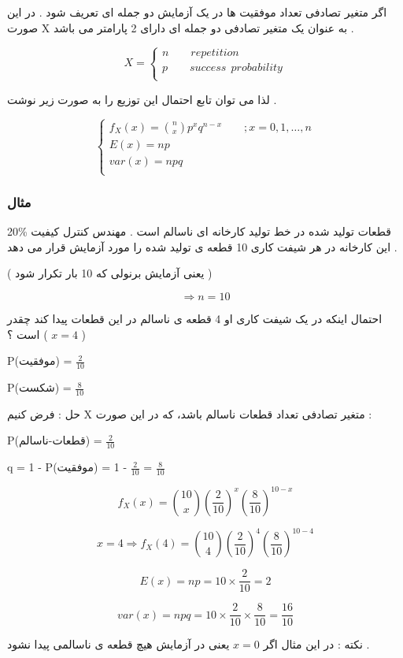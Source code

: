 \documentclass[12pt]{book}
\begin{document}
اگر متغیر تصادفی تعداد موفقیت ها در یک آزمایش دو جمله ای تعریف شود . در این صورت X به عنوان یک متغیر تصادفی دو جمله ای دارای 2 پارامتر می باشد .

$$
X = 
\begin{cases}
n \qquad repetition\\
p \qquad success \:\: probability\\
\end{cases}
$$


لذا می توان تابع احتمال این توزیع را به صورت زیر نوشت .

$$
\begin{cases}
f_{X}(x) = \binom{n}{x} p^{x} q^{n-x} \qquad ; x = 0 , 1 , \dots , n \\
E(x) = np \\
var(x) = npq \\
\end{cases}
$$



\subsubsection{مثال}
20\% قطعات تولید شده در خط تولید کارخانه ای ناسالم است . مهندس کنترل کیفیت این کارخانه در هر شیفت کاری 10 قطعه ی تولید شده را مورد آزمایش قرار می دهد .

( یعنی آزمایش برنولی که 10 بار تکرار شود )

$$\Rightarrow n = 10$$

احتمال اینکه در یک شیفت کاری او 4 قطعه ی ناسالم در این قطعات پیدا کند چقدر است ؟ (
$x=4$
)



P(موفقیت) = $\frac{2}{10}$

P(شکست) = $\frac{8}{10}$

حل : فرض کنیم X متغیر تصادفی تعداد قطعات ناسالم باشد، که در این صورت :

P(قطعات-ناسالم) = $\frac{2}{10}$


q = 1 - P(موفقیت) = 1 - $\frac{2}{10}$ = $\frac{8}{10}$


$$
f_{X}(x) = \binom{10}{x} (\frac{2}{10})^{x} (\frac{8}{10})^{10-x}
$$

$$
x = 4 \Rightarrow f_{X}(4) = \binom{10}{4} (\frac{2}{10})^{4} (\frac{8}{10})^{10-4}
$$

$$
E(x) = np = 10 \times \frac{2}{10} = 2
$$

$$
var(x) = npq = 10 \times \frac{2}{10} \times \frac{8}{10} = \frac{16}{10}
$$


نکته : در این مثال اگر 
$x = 0$
یعنی در آزمایش هیچ قطعه ی ناسالمی پیدا نشود .
\end{document}
